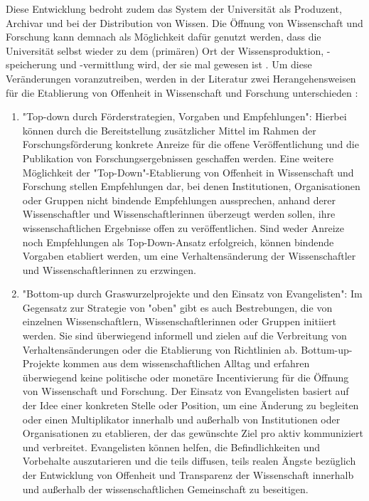 Diese Entwicklung bedroht zudem das System der Universität als Produzent, Archivar und bei der Distribution von Wissen. Die Öffnung von Wissenschaft und Forschung kann demnach als Möglichkeit dafür genutzt werden, dass die Universität selbst wieder zu dem (primären) Ort der Wissensproduktion, -speicherung und -vermittlung wird, der sie mal gewesen ist \cite{Kittler_2004}. Um diese Veränderungen voranzutreiben, werden in der Literatur zwei Herangehensweisen für die Etablierung von Offenheit in Wissenschaft und Forschung unterschieden \cite{Schulze_2013}:
\begin{enumerate}
\item "Top-down durch Förderstrategien, Vorgaben und Empfehlungen": Hierbei können durch die Bereitstellung zusätzlicher Mittel im Rahmen der Forschungsförderung konkrete Anreize für die offene Veröffentlichung und die Publikation von Forschungsergebnissen geschaffen werden. Eine weitere Möglichkeit der "Top-Down"-Etablierung von Offenheit in Wissenschaft und Forschung stellen Empfehlungen dar, bei denen Institutionen, Organisationen oder Gruppen nicht bindende Empfehlungen aussprechen, anhand derer Wissenschaftler und Wissenschaftlerinnen überzeugt werden sollen, ihre wissenschaftlichen Ergebnisse offen zu veröffentlichen. Sind weder Anreize noch Empfehlungen als Top-Down-Ansatz erfolgreich, können bindende Vorgaben etabliert werden, um eine Verhaltensänderung der Wissenschaftler und Wissenschaftlerinnen zu erzwingen.
\item "Bottom-up durch Graswurzelprojekte und den Einsatz von Evangelisten":
Im Gegensatz zur Strategie von "oben" gibt es auch Bestrebungen, die von einzelnen Wissenschaftlern, Wissenschaftlerinnen oder Gruppen initiiert werden. Sie sind überwiegend informell und zielen auf die Verbreitung von Verhaltensänderungen oder die Etablierung von Richtlinien ab. Bottum-up-Projekte kommen aus dem wissenschaftlichen Alltag und erfahren überwiegend keine politische oder monetäre Incentivierung für die Öffnung von Wissenschaft und Forschung. Der Einsatz von Evangelisten basiert auf der Idee einer konkreten Stelle oder Position, um eine Änderung zu begleiten oder einen Multiplikator innerhalb und außerhalb von Institutionen oder Organisationen zu etablieren, der das gewünschte Ziel pro aktiv kommuniziert und verbreitet. Evangelisten können helfen, die Befindlichkeiten und Vorbehalte auszutarieren und die teils diffusen, teils realen Ängste bezüglich der Entwicklung von Offenheit und Transparenz der Wissenschaft innerhalb und außerhalb der wissenschaftlichen Gemeinschaft zu beseitigen.
\end{enumerate}

